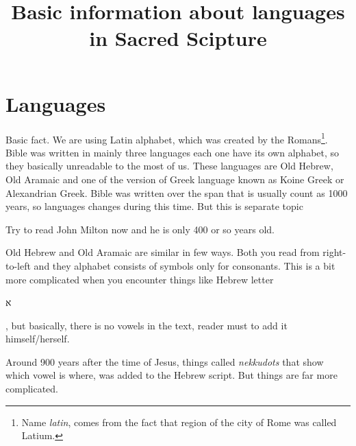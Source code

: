 \documentclass[a4paper,11pt]{article}
\title{Basic information about languages in Sacred Scipture}
\begin{document}





\maketitle %





\section{Languages} %



Basic fact. We are using Latin alphabet, which was created by the
Romans\footnote{Name \textit{latin}, comes from the fact that region of the
  city of Rome was called Latium.}. Bible was written in mainly three
languages each one have its own alphabet, so they basically unreadable to
the most of us. These languages are Old Hebrew, Old Aramaic and one of the
version of Greek language known as Koine Greek or Alexandrian Greek. Bible
was written over the span that is usually count as 1000 years, so languages
changes during this time. But this is separate topic

Try to read John Milton now and he is only 400 or so years old.

Old Hebrew and Old Aramaic are similar in few ways. Both you read from
right-to-left and they alphabet consists of symbols only for consonants.
This is a bit more complicated when you encounter things like Hebrew letter
\begin{hebrew} א \end{hebrew}, but basically, there is no vowels in the
text, reader must to add it himself/herself.

Around 900 years after the time of Jesus, things called \textit{nekkudots}
that show which vowel is where, was added to the Hebrew script. But things
are far more complicated.
\end{document}
